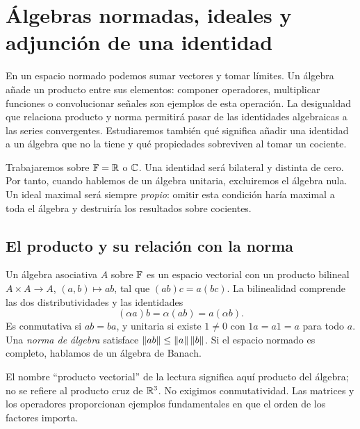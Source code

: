 \chapter{Álgebras normadas, ideales y adjunción de una identidad}\label{cap:v3-10}

En un espacio normado podemos sumar vectores y tomar límites. Un álgebra añade un producto entre sus elementos: componer operadores, multiplicar funciones o convolucionar señales son ejemplos de esta operación. La desigualdad que relaciona producto y norma permitirá pasar de las identidades algebraicas a las series convergentes. Estudiaremos también qué significa añadir una identidad a un álgebra que no la tiene y qué propiedades sobreviven al tomar un cociente.

Trabajaremos sobre $\mathbb F=\mathbb R$ o $\mathbb C$. Una identidad será bilateral y distinta de cero. Por tanto, cuando hablemos de un álgebra unitaria, excluiremos el álgebra nula. Un ideal maximal será siempre \emph{propio}: omitir esta condición haría maximal a toda el álgebra y destruiría los resultados sobre cocientes.

\section{El producto y su relación con la norma}\label{lec:v3-19}

\begin{definicion}
Un álgebra asociativa $A$ sobre $\mathbb F$ es un espacio vectorial con un producto bilineal $A\times A\to A$, $(a,b)\mapsto ab$, tal que $(ab)c=a(bc)$. La bilinealidad comprende las dos distributividades y las identidades
\[
 (\alpha a)b=\alpha(ab)=a(\alpha b).
\]
Es conmutativa si $ab=ba$, y unitaria si existe $1\ne0$ con $1a=a1=a$ para todo $a$. Una \emph{norma de álgebra} satisface $\left\lVert ab\right\rVert\leq\left\lVert a\right\rVert\left\lVert b\right\rVert$. Si el espacio normado es completo, hablamos de un álgebra de Banach.
\end{definicion}

El nombre ``producto vectorial'' de la lectura significa aquí producto del álgebra; no se refiere al producto cruz de $\mathbb R^3$. No exigimos conmutatividad. Las matrices y los operadores proporcionan ejemplos fundamentales en que el orden de los factores importa.

